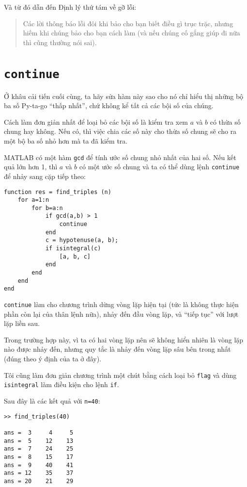 \documentclass[12pt]{book}
\begin{document}
Và từ đó dẫn đến Định lý thứ tám về gỡ lỗi:

\begin{quote}
Các lời thông báo lỗi đôi khi bảo cho bạn biết điều gì trục trặc,
nhưng hiếm khi chúng bảo cho bạn cách làm (và nếu chúng cố gắng
giúp đi nữa thì cũng thường nói sai).
\end{quote}


\section{{\tt continue}}

Ở khâu cải tiến cuối cùng, ta hãy sửa hàm này sao cho nó chỉ 
hiểu thị những bộ ba số Py-ta-go ``thấp nhất'', chứ không kể tất cả
các bội số của chúng.

Cách làm đơn giản nhất để loại bỏ các bội số là kiểm tra xem 
$a$ và $b$ có thừa số chung hay không. Nếu có, thì việc chia
các số này cho thừa số chung sẽ cho ra một bộ ba số nhỏ hơn
mà ta đã kiểm tra.

MATLAB có một hàm {\tt gcd} để tính ước số chung nhỏ nhất
của hai số. Nếu kết quả lớn hơn 1, thì $a$ và $b$ có một 
ước số chung và ta có thể dùng lệnh {\tt continue} để
nhảy sang cặp tiếp theo:

\begin{verbatim}
function res = find_triples (n)
    for a=1:n
        for b=a:n
            if gcd(a,b) > 1
                continue
            end
            c = hypotenuse(a, b);
            if isintegral(c)
                [a, b, c]
            end
        end
    end
end
\end{verbatim}

{\tt continue} làm cho chương trình dừng vòng lặp hiện tại
(tức là không thực hiện phần còn lại của thân lệnh nữa), 
nhảy đến đầu vòng lặp, và ``tiếp tục'' với lượt lặp liền sau.

Trong trường hợp này, vì ta có hai vòng lặp nên sẽ không hiển
nhiên là vòng lặp nào được nhảy đến, nhưng quy tắc là nhảy đến
vòng lặp sâu bên trong nhất (đúng theo ý định của ta ở đây).

Tôi cũng làm đơn giản chương trình một chút bằng cách loại bỏ
{\tt flag} và dùng {\tt isintegral} làm điều kiện cho lệnh
{\tt if}.

Sau đây là các kết quả với {\tt n=40}:

\begin{verbatim}
>> find_triples(40)

ans =  3     4     5
ans =  5    12    13
ans =  7    24    25
ans =  8    15    17
ans =  9    40    41
ans = 12    35    37
ans = 20    21    29
\end{verbatim}
\end{document}
